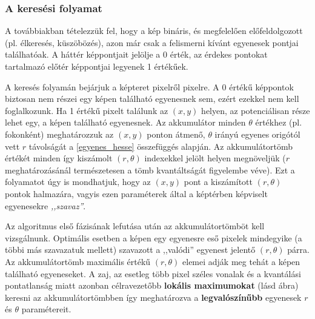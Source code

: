 \subsubsection{A keresési folyamat}\label{sect:kereses_folyamata}

A továbbiakban tételezzük fel, hogy a kép bináris, és megfelelően előfeldolgozott (pl. élkeresés, küszöbözés), azon már csak a felismerni kívánt egyenesek pontjai találhatóak. A háttér képpontjait jelölje a 0 érték, az érdekes pontokat tartalmazó előtér képpontjai legyenek 1 értékűek.

A keresés folyamán bejárjuk a képteret pixelről pixelre. A 0 értékű képpontok biztosan nem részei egy képen található egyenesnek sem, ezért ezekkel nem kell foglalkozunk. Ha 1 értékű pixelt találunk az $ (x,y) $ helyen, az potenciálisan része lehet egy, a képen található egyenesnek. Az akkumulátor minden $ \theta $ értékhez (pl. fokonként) meghatározzuk az $ (x,y) $ ponton átmenő, $ \theta $ irányú egyenes origótól vett $ r $ távolságát a \eqref{egyenes_hesse} összefüggés alapján. Az akkumulátortömb értékét minden így kiszámolt $ (r,\theta) $ indexekkel jelölt helyen megnöveljük ($ r $ meghatározásánál természetesen a tömb kvantáltságát figyelembe véve). Ezt a folyamatot úgy is mondhatjuk, hogy az $ (x,y) $ pont a kiszámított $ (r, \theta) $ pontok halmazára, vagyis ezen paraméterek által a képtérben képviselt egyenesekre \emph{,,szavaz''}.

Az algoritmus első fázisának lefutása után az akkumulátortömböt kell vizsgálnunk. Optimális esetben a képen egy egyenesre eső pixelek mindegyike (a többi más szavazatuk mellett) szavazott a ,,valódi'' egyenest jelentő $ (r, \theta) $ párra. Az akkumulátortömb maximális értékű $ (r, \theta) $ elemei adják meg tehát a képen található egyeneseket. A zaj, az esetleg több pixel széles vonalak és a kvantálási pontatlanság miatt azonban célravezetőbb \textbf{lokális maximumokat} (lásd  ábra) keresni az akkumulátortömbben így meghatározva a \textbf{legvalószínűbb} egyenesek $ r $ és $ \theta $ paramétereit.

